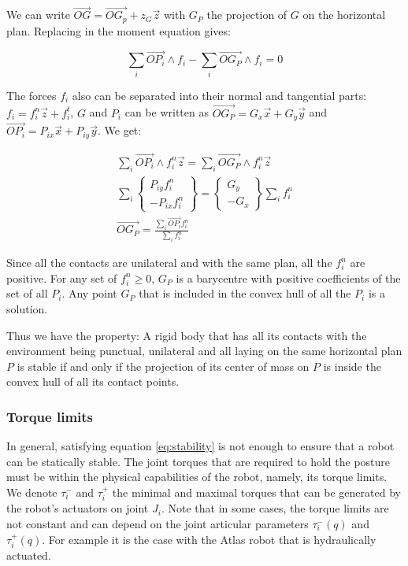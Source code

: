 We can write $\overrightarrow{OG} = \overrightarrow{OG_p} + z_G\vec{z}$ with $G_P$ the projection of $G$ on the horizontal plan. Replacing in the moment equation gives:

\begin{equation}
  \sum\limits_i \overrightarrow{OP_i}\wedge f_i - \sum\limits_i\overrightarrow{OG_P} \wedge f_i = 0
\end{equation}

The forces $f_i$ also can be separated into their normal and tangential parts: $f_i = f_i^n\vec{z} + f_i^t$, $G$ and $P_i$ can be written as $\overrightarrow{OG_P} = G_x \vec{x} + G_y\vec{y}$ and $\overrightarrow{OP_i} = P_{ix} \vec{x} + P_{iy} \vec{y}$. We get:

\begin{align}
  \sum\limits_i \overrightarrow{OP_i}\wedge f_i^n\vec{z} = \sum\limits_i\overrightarrow{OG_P} \wedge f_i^n\vec{z} \\
\sum\limits_i \left\{\begin{array}{r} P_{iy}f_i^n\\-P_{ix}f_i^n\end{array}\right\}
= \left\{\begin{array}{r} G_{y}\\-G_{x}\end{array}\right\} \sum\limits_if_i^n\\
  \overrightarrow{OG_P} = \frac{\sum\limits_i \overrightarrow{OP_i} f_i^n}{\sum\limits_if_i^n}
\end{align}

Since all the contacts are unilateral and with the same plan, all the $f_i^n$ are positive.
For any set of $f_i^n\geq0$, $G_P$ is a barycentre with positive coefficients of the set of all $P_i$.
Any point $G_P$ that is included in the convex hull of all the $P_i$ is a solution.

Thus we have the property: A rigid body that has all its contacts with the environment being punctual, unilateral and all laying on the same horizontal plan $P$ is stable if and only if the projection of its center of mass on $P$ is inside the convex hull of all its contact points.

\subsubsection{Torque limits}
\label{subsub:torque_limits}

In general, satisfying equation \ref{eq:stability} is not enough to ensure that a robot can be statically stable.
The joint torques that are required to hold the posture must be within the physical capabilities of the robot, namely, its torque limits.
We denote $\tau_i^-$ and $\tau_i^+$ the minimal and maximal torques that can be generated by the robot's actuators on joint $J_i$.
Note that in some cases, the torque limits are not constant and can depend on the joint articular parameters $\tau_i^-(q)$ and $\tau_i^+(q)$.
For example it is the case with the Atlas robot that is hydraulically actuated.

